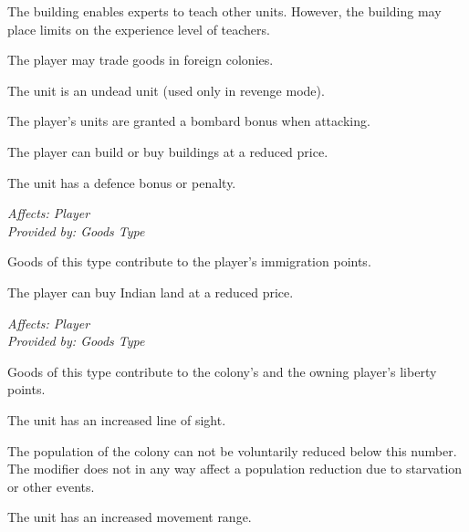 \documentclass[12pt]{book}
\begin{document}
The building enables experts to teach other units. However, the
building may place limits on the experience level of teachers.

\affectsPlayer

The player may trade goods in foreign colonies.

\affectsUnit

The unit is an undead unit (used only in revenge mode).





\affectsPlayer

The player's units are granted a bombard bonus when attacking.

\affectsPlayer

The player can build or buy buildings at a reduced price.

\affectsUnit

The unit has a defence bonus or penalty.

\textit{Affects: Player\\Provided by: Goods Type}

Goods of this type contribute to the player's immigration points.

\affectsPlayer

The player can buy Indian land at a reduced price.

\textit{Affects: Player\\Provided by: Goods Type}

Goods of this type contribute to the colony's and the owning player's
liberty points.

\affectsUnit

The unit has an increased line of sight.

\affectsColonyTwo

The population of the colony can not be voluntarily reduced below this
number. The modifier does not in any way affect a population reduction
due to starvation or other events.

\affectsUnit

The unit has an increased movement range.
\end{document}
